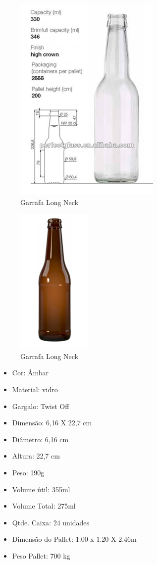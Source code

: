 \begin{figure}[!h]
	\centering
		\includegraphics[scale=0.8]{figuras/estrutura/24.png}
	\caption{Garrafa Long Neck}
\end{figure}

\begin{figure}[!h]
	\centering
		\includegraphics[scale=0.7]{figuras/estrutura/25.png}
	\caption{Garrafa Long Neck}
\end{figure}

\begin{itemize}
    \item Cor: Âmbar
    \item Material: vidro
    \item Gargalo: Twist Off
    \item Dimensão: 6,16 X 22,7 cm
    \item Diâmetro: 6,16 cm
    \item Altura: 22,7 cm
    \item Peso: 190g
    \item Volume útil: 355ml
    \item Volume Total: 275ml
    \item Qtde. Caixa: 24 unidades
    \item Dimensão do Pallet: 1.00 x 1.20 X 2.46m
    \item Peso Pallet: 700 kg
\end{itemize}

